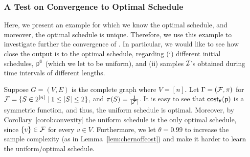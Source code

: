 \begin{table}[ht]
\centering
{}
\end{table}



\subsubsection{A Test on Convergence to  Optimal Schedule}\label{sec:example}
Here, we present an example for which we know the optimal schedule, and moreover, the optimal schedule is unique. Therefore, we use this example to investigate further the convergence of \algonameapx. In particular, we would like to see how close the \algonameapx output is to the optimal schedule, regarding (i) different initial schedules, $\mathsf{p}^0$ (which we let to be uniform), and (ii) samples $\mathcal{I}$'s  obtained during time intervals of different lengths.

Suppose $G=(V,E)$ is the complete graph where $V=[n]$. Let $\Gamma=(\mathcal{F}, \pi)$ for  $\mathcal{F} = \{S \in 2^{[n]} \mid 1 \leq|S| \leq 2\}$, and $\pi(S)=\frac{1}{|\mathcal{F}|}$. It is easy to see that $\mathsf{cost}_\theta(\mathsf{p})$ is a symmetric function, and thus, the uniform schedule is optimal. Moreover, by Corollary~\ref{corol:convexity} the uniform schedule is the only optimal schedule, since $\{v\} \in \mathcal{F}$ for every $v\in V$. Furthermore, we let $\theta=0.99$ to increase the sample complexity (as in Lemma~\ref{lem:chernoffcost}) and make it harder to learn the uniform/optimal schedule.

